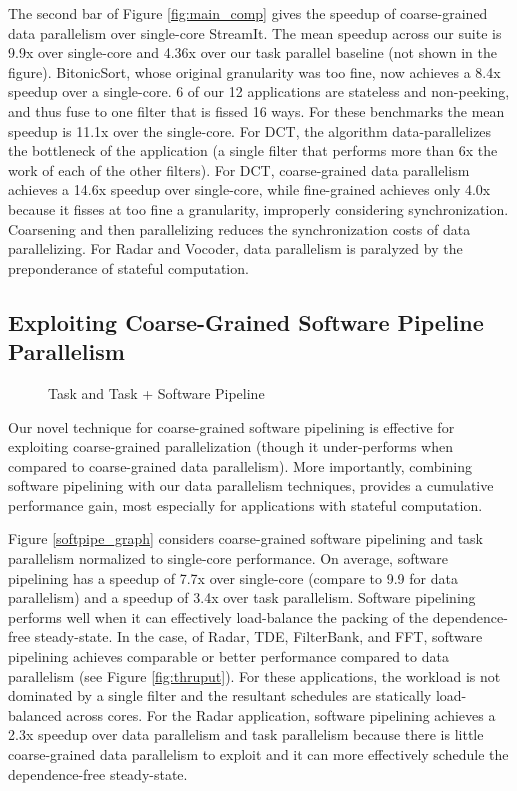 The second bar of Figure \ref{fig:main_comp} gives the speedup of
coarse-grained data parallelism over single-core StreamIt. The mean
speedup across our suite is 9.9x over single-core and 4.36x over our
task parallel baseline (not shown in the figure).  BitonicSort, whose
original granularity was too fine, now achieves a 8.4x speedup over a
single-core. 6 of our 12 applications are stateless and non-peeking,
and thus fuse to one filter that is fissed 16 ways.  For these
benchmarks the mean speedup is 11.1x over the single-core.  For DCT,
the algorithm data-parallelizes the bottleneck of the application (a
single filter that performs more than 6x the work of each of the other
filters).  For DCT, coarse-grained data parallelism achieves a 14.6x
speedup over single-core, while fine-grained achieves only 4.0x
because it fisses at too fine a granularity, improperly considering
synchronization.  Coarsening and then parallelizing reduces the
synchronization costs of data parallelizing.  For Radar and Vocoder,
data parallelism is paralyzed by the preponderance of stateful
computation.

\subsection{Exploiting Coarse-Grained Software Pipeline Parallelism}

\begin{figure}[t]
\centering
{}
\caption{Task and Task + Software Pipeline
\protect\label{fig:softpipe_graph}}
\end{figure}
Our novel technique for coarse-grained software pipelining is
effective for exploiting coarse-grained parallelization (though it
under-performs when compared to coarse-grained data parallelism).
More importantly, combining software pipelining with our data
parallelism techniques, provides a cumulative performance gain,
most especially for applications with stateful computation.

Figure \ref{softpipe_graph} considers coarse-grained software
pipelining and task parallelism normalized to single-core performance.
On average, software pipelining has a speedup of 7.7x over single-core
(compare to 9.9 for data parallelism) and a speedup of 3.4x over task
parallelism. Software pipelining performs well when it can effectively
load-balance the packing of the dependence-free steady-state.  In the
case, of Radar, TDE, FilterBank, and FFT, software pipelining achieves
comparable or better performance compared to data parallelism (see
Figure \ref{fig:thruput}).  For these applications, the workload is
not dominated by a single filter and the resultant schedules are
statically load-balanced across cores.  For the Radar application,
software pipelining achieves a 2.3x speedup over data parallelism and
task parallelism because there is little coarse-grained data
parallelism to exploit and it can more effectively schedule the
dependence-free steady-state.

